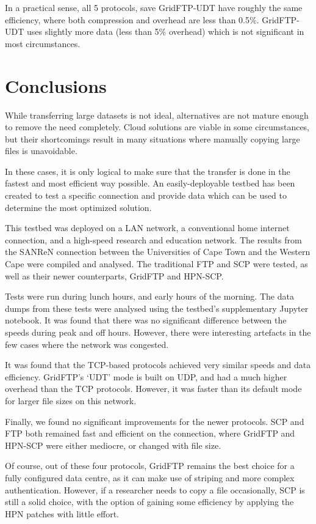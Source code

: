 \documentclass{sig-alternate-05-2015}
\begin{document}
In a practical sense, all 5 protocols, save GridFTP-UDT have roughly the same efficiency, where both compression and overhead are less than 0.5\%. GridFTP-UDT uses slightly more data (less than 5\% overhead) which is not significant in most circumstances.

\section{Conclusions}
While transferring large datasets is not ideal, alternatives are not mature enough to remove the need completely. Cloud solutions are viable in some circumstances, but their shortcomings result in many situations where manually copying large files is unavoidable.

In these cases, it is only logical to make sure that the transfer is done in the fastest and most efficient way possible. An easily-deployable testbed has been created to test a specific connection and provide data which can be used to determine the most optimized solution.

This testbed was deployed on a LAN network, a conventional home internet connection, and a high-speed research and education network. The results from the SANReN connection between the Universities of Cape Town and the Western Cape were compiled and analysed. The traditional FTP and SCP were tested, as well as their newer counterparts, GridFTP and HPN-SCP.

Tests were run during lunch hours, and early hours of the morning. The data dumps from these tests were analysed using the testbed's supplementary Jupyter notebook. It was found that there was no significant difference between the speeds during peak and off hours. However, there were interesting artefacts in the few cases where the network was congested.

It was found that the TCP-based protocols achieved very similar speeds and data efficiency. GridFTP's `UDT' mode is built on UDP, and had a much higher overhead than the TCP protocols. However, it was faster than its default mode for larger file sizes on this network.

Finally, we found no significant improvements for the newer protocols. SCP and FTP both remained fast and efficient on the connection, where GridFTP and HPN-SCP were either mediocre, or changed with file size.

Of course, out of these four protocols, GridFTP remains the best choice for a fully configured data centre, as it can make use of striping and more complex authentication. However, if a researcher needs to copy a file occasionally, SCP is still a solid choice, with the option of gaining some efficiency by applying the HPN patches with little effort.
\end{document}

